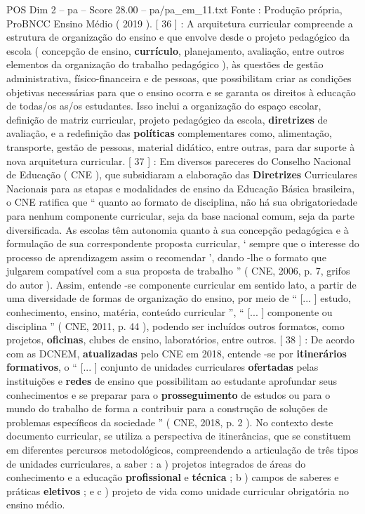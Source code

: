 \begin{textsample}{POS Dim 2 – pa – Score 28.00 – pa/pa\_em\_11.txt}
Fonte : Produção própria, ProBNCC Ensino Médio ( 2019 ). [ 36 ] : A arquitetura curricular compreende a estrutura de organização do ensino e que envolve desde o projeto pedagógico da escola ( concepção de ensino, \textbf{currículo}, planejamento, avaliação, entre outros elementos da organização do trabalho pedagógico ), às questões de gestão administrativa, físico-financeira e de pessoas, que possibilitam criar as condições objetivas necessárias para que o ensino ocorra e se garanta os direitos à educação de todas/os as/os estudantes.
Isso inclui a organização do espaço escolar, definição de matriz curricular, projeto pedagógico da escola, \textbf{diretrizes} de avaliação, e a redefinição das \textbf{políticas} complementares como, alimentação, transporte, gestão de pessoas, material didático, entre outras, para dar suporte à nova arquitetura curricular. [ 37 ] : Em diversos pareceres do Conselho Nacional de Educação ( CNE ), que subsidiaram a elaboração das \textbf{Diretrizes} Curriculares Nacionais para as etapas e modalidades de ensino da Educação Básica brasileira, o CNE ratifica que “ quanto ao formato de disciplina, não há sua obrigatoriedade para nenhum componente curricular, seja da base nacional comum, seja da parte diversificada.
As escolas têm autonomia quanto à sua concepção pedagógica e à formulação de sua correspondente proposta curricular, ‘ sempre que o interesse do processo de aprendizagem assim o recomendar ’, dando -lhe o formato que julgarem compatível com a sua proposta de trabalho ” ( CNE, 2006, p. 7, grifos do autor ).
Assim, entende -se componente curricular em sentido lato, a partir de uma diversidade de formas de organização do ensino, por meio de “ [... ] estudo, conhecimento, ensino, matéria, conteúdo curricular ”, “ [... ] componente ou disciplina ” ( CNE, 2011, p. 44 ), podendo ser incluídos outros formatos, como projetos, \textbf{oficinas}, clubes de ensino, laboratórios, entre outros. [ 38 ] : De acordo com as DCNEM, \textbf{atualizadas} pelo CNE em 2018, entende -se por \textbf{itinerários} \textbf{formativos}, o “ [... ] conjunto de unidades curriculares \textbf{ofertadas} pelas instituições e \textbf{redes} de ensino que possibilitam ao estudante aprofundar seus conhecimentos e se preparar para o \textbf{prosseguimento} de estudos ou para o mundo do trabalho de forma a contribuir para a construção de soluções de problemas específicos da sociedade ” ( CNE, 2018, p. 2 ).
No contexto deste documento curricular, se utiliza a perspectiva de itinerâncias, que se constituem em diferentes percursos metodológicos, compreendendo a articulação de três tipos de unidades curriculares, a saber : a ) projetos integrados de áreas do conhecimento e a educação \textbf{profissional} e \textbf{técnica} ; b ) campos de saberes e práticas \textbf{eletivos} ; e c ) projeto de vida como unidade curricular obrigatória no ensino médio.

\end{textsample}
